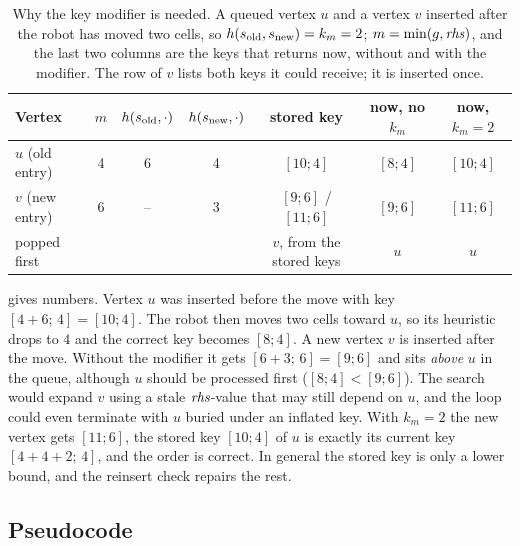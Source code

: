 \begin{table}[tb]
  \centering\footnotesize
  \caption{Why the key modifier is needed. A queued vertex $u$ and a vertex $v$ inserted
  after the robot has moved two cells, so $h(s_{\mathrm{old}},s_{\mathrm{new}})=k_m=2$;
  $m=\min(g,\mathit{rhs})$, and the last two columns are the keys that
  \protect\DslCalculateKey returns now, without and with the modifier. The row of $v$
  lists both keys it could receive; it is inserted once.}
  \label{tab:ch05-km}
  \begin{tabular}{@{}lcccccc@{}}
  \toprule
  Vertex & $m$ & $h(s_{\mathrm{old}},\cdot)$ & $h(s_{\mathrm{new}},\cdot)$ & stored key & now, no $k_m$ & now, $k_m=2$\\
  \midrule
  $u$ (old entry) & 4 & 6 & 4 & $[10;4]$ & $[8;4]$ & $[10;4]$\\
  $v$ (new entry) & 6 & -- & 3 & $[9;6]$ / $[11;6]$ & $[9;6]$ & $[11;6]$\\
  \midrule
  popped first & & & & $v$, from the stored keys & $u$ & $u$\\
  \bottomrule
  \end{tabular}
\end{table}

 gives numbers. Vertex $u$ was inserted before the move with key
$[4+6;\,4]=[10;4]$. The robot then moves two cells toward $u$, so its heuristic drops to
$4$ and the correct key becomes $[8;4]$. A new vertex $v$ is inserted after the move.
Without the modifier it gets $[6+3;\,6]=[9;6]$ and sits \emph{above} $u$ in the queue,
although $u$ should be processed first ($[8;4] < [9;6]$). The search would expand $v$
using a stale $\mathit{rhs}$-value that may still depend on $u$, and the loop could even
terminate with $u$ buried under an inflated key. With $k_m=2$ the new vertex gets
$[11;6]$, the stored key $[10;4]$ of $u$ is exactly its current key
$[4+4+2;\,4]$, and the order is correct. In general the stored key is only a lower
bound, and the reinsert check repairs the rest.

\subsection{Pseudocode}
\label{sec:ch05-dstarlite-pseudocode}

